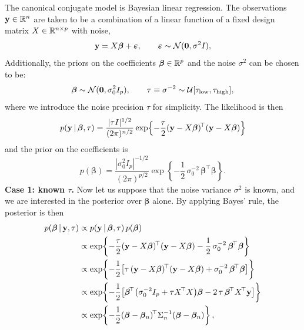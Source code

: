 The canonical conjugate model is Bayesian linear regression. The
observations $\mathbf{y} \in \mathbb{R}^n$ are taken to be a combination of a linear function of a fixed
design matrix $X \in \mathbb{R}^{n \times p}$ with noise,
%
\begin{equation}
  \mathbf{y} = X\bm{\beta} + \bm{\varepsilon}, \qquad
  \bm{\varepsilon} \sim \mathcal{N}(\mathbf{0}, \sigma^2 I),
\end{equation}
%
Additionally, the priors on the coefficients $\bm{\beta} \in \mathbb{R}^p$
and the noise $\sigma^2$ can be chosen to be:
%
\begin{equation}
  \bm{\beta} \sim \mathcal{N}(\mathbf{0}, \sigma_0^2 I_p), \qquad
  \tau \equiv \sigma^{-2} \sim
  \mathcal{U}[\tau_{\text{low}}, \tau_{\text{high}}],
  \label{eq:lr-model}
\end{equation}
%
where we introduce the noise precision $\tau$ for simplicity. The
likelihood is then
%
\begin{equation}
  p(\mathbf{y} \,|\, \bm{\beta}, \tau)
  = \frac{|\tau I|^{1/2}}{(2\pi)^{n/2}}
    \exp\!\left \{-\frac{\tau}{2}
    (\mathbf{y} - X\bm{\beta})^{\!\top}(\mathbf{y} - X\bm{\beta})\right \}
\end{equation}
%
and the prior on the coefficients is
%
\begin{equation}
  p(\bm{\beta})
  = \frac{|\sigma_0^2 I_p|^{-1/2}}{(2\pi)^{p/2}}
    \exp\!\left \{-\frac{1}{2}\,\sigma_0^{-2}\,
    \bm{\beta}^{\!\top}\bm{\beta}\right \}.
\end{equation}
%
\textbf{Case 1: known $\tau$.} Now let us suppose that the noise
variance $\sigma^2$ is known, and we are interested in the posterior
over $\bm{\beta}$ alone. By applying Bayes' rule, the posterior is then
%
\begin{align}
  p(\bm{\beta} \given \mathbf{y}, \tau)
  &\propto p(\mathbf{y} \given \bm{\beta}, \tau)\,p(\bm{\beta}) \notag\\
  &\propto \exp\!\left \{-\frac{\tau}{2}
    (\mathbf{y} - X\bm{\beta})^{\!\top}(\mathbf{y} - X\bm{\beta})
    -\frac{1}{2}\,\sigma_0^{-2}\,\bm{\beta}^{\!\top}\bm{\beta}\right \} \\
  &\propto \exp\!\left \{-\frac{1}{2}\big[
    \tau\,(\mathbf{y} - X\bm{\beta})^{\!\top}(\mathbf{y} - X\bm{\beta})
    + \sigma_0^{-2}\,\bm{\beta}^{\!\top}\bm{\beta}\big]\right \} \\
  &\propto \exp\!\left \{-\frac{1}{2}\big[
    \bm{\beta}^{\!\top}\big(\sigma_0^{-2} I_p + \tau X^{\!\top}X\big)
    \bm{\beta}
    - 2\,\tau\,\bm{\beta}^{\!\top}X^{\!\top}\mathbf{y}\big]\right \} \\
  &\propto \exp\!\left \{-\frac{1}{2}(\bm{\beta} - \bm{\beta}_n)^{\!\top}
    \Sigma_n^{-1}(\bm{\beta} - \bm{\beta}_n)\right \},
\end{align}
